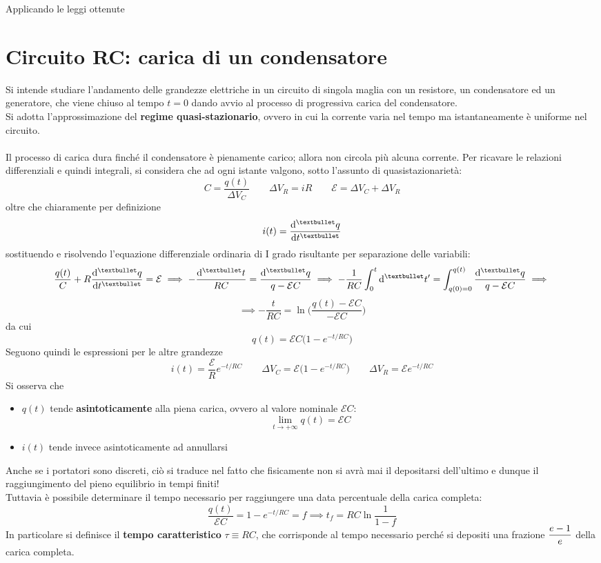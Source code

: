 Applicando le leggi ottenute


\section{Circuito RC: carica di un condensatore}
Si intende studiare l'andamento delle grandezze elettriche in un circuito di singola maglia con un resistore, un condensatore ed un generatore, che viene chiuso al tempo $t = 0$ dando avvio al processo di progressiva carica del condensatore.
\\Si adotta l'approssimazione del \textbf{regime quasi-stazionario}, ovvero in cui la corrente varia nel tempo ma istantaneamente è uniforme nel circuito.
\\~\\
Il processo di carica dura finché il condensatore è pienamente carico; allora non circola più alcuna corrente. Per ricavare le relazioni differenziali e quindi integrali, si considera che ad ogni istante valgono, sotto l'assunto di quasistazionarietà:
\[C = \frac{q(t)}{\Delta V_C} \qquad \Delta V_{R} = iR \qquad \mathcal{E} = \Delta V_C + \Delta V_R\]
oltre che chiaramente per definizione
\[i(t) = \dv[•]{q}{t}(t)\]
sostituendo e risolvendo l'equazione differenziale ordinaria di I grado risultante per separazione delle variabili:
\[\frac{q(t)}{C} + R \dv[•]{q}{t}(t) = \mathcal{E} \implies - \frac{\dd[•]{t}}{RC} = \frac{\dd[•]{q}}{q - \mathcal{E}C} \implies - \frac{1}{RC} \int_0^t \dd[•]{t'} = \int_{q(0) = 0}^{q(t)} \frac{\dd[•]{q}}{q - \mathcal{E}C} \implies\]
\[\implies - \frac{t}{RC} = \ln \bigg( \frac{q(t) - \mathcal{E}C}{-\mathcal{E}C} \bigg)\]
da cui
\[q(t) = \mathcal{E}C \big(1 - e^{-t/RC}\big)\]
Seguono quindi le espressioni per le altre grandezze
\[i(t) = \frac{\mathcal{E}}{R} e^{-t/RC} \qquad \Delta V_C = \mathcal{E} \big(1 - e^{-t/RC}\big) \qquad \Delta V_R = \mathcal{E}e^{-t/RC}\]
Si osserva che
\begin{itemize}
\item $q(t)$ tende \textbf{asintoticamente} alla piena carica, ovvero al valore nominale $\mathcal{E}C$:
\[\lim\limits_{t \rightarrow +\infty} q(t) = \mathcal{E}C\]
\item $i(t)$ tende invece asintoticamente ad annullarsi
\end{itemize}
Anche se i portatori sono discreti, ciò si traduce nel fatto che fisicamente non si avrà mai il depositarsi dell'ultimo e dunque il raggiungimento del pieno equilibrio in tempi finiti!
\\Tuttavia è possibile determinare il tempo necessario per raggiungere una data percentuale della carica completa:
\[\frac{q(t)}{\mathcal{E}C} = 1 - e^{-t/RC} = f \implies t_f = RC \ln \frac{1}{1-f}\]
In particolare si definisce il \textbf{tempo caratteristico} $\tau \equiv RC$, che corrisponde al tempo necessario perché si depositi una frazione $\displaystyle \frac{e-1}{e}$ della carica completa.

